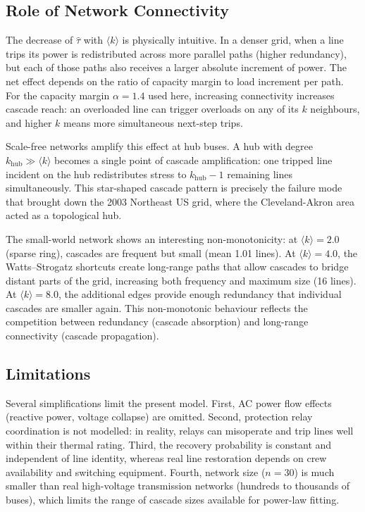 \documentclass[12pt,a4paper]{article}
\begin{document}
\subsection{Role of Network Connectivity}

The decrease of $\hat{\tau}$ with $\langle k \rangle$ is physically
intuitive. In a denser grid, when a line trips its power is
redistributed across more parallel paths (higher redundancy), but
each of those paths also receives a larger absolute increment of
power. The net effect depends on the ratio of capacity margin to
load increment per path. For the capacity margin $\alpha = 1.4$
used here, increasing connectivity increases cascade reach: an
overloaded line can trigger overloads on any of its $k$ neighbours,
and higher $k$ means more simultaneous next-step trips.

Scale-free networks amplify this effect at hub buses. A hub with
degree $k_\text{hub} \gg \langle k \rangle$ becomes a single
point of cascade amplification: one tripped line incident on the
hub redistributes stress to $k_\text{hub} - 1$ remaining lines
simultaneously. This star-shaped cascade pattern is precisely
the failure mode that brought down the 2003 Northeast US grid,
where the Cleveland-Akron area acted as a topological hub.

The small-world network shows an interesting non-monotonicity:
at $\langle k \rangle = 2.0$ (sparse ring), cascades are frequent
but small (mean 1.01 lines). At $\langle k \rangle = 4.0$,
the Watts--Strogatz shortcuts create long-range paths that allow
cascades to bridge distant parts of the grid, increasing both
frequency and maximum size (16 lines). At $\langle k \rangle = 8.0$,
the additional edges provide enough redundancy that individual
cascades are smaller again. This non-monotonic behaviour reflects
the competition between redundancy (cascade absorption) and
long-range connectivity (cascade propagation).

\subsection{Limitations}

Several simplifications limit the present model. First, AC power
flow effects (reactive power, voltage collapse) are omitted. Second,
protection relay coordination is not modelled: in reality, relays can
misoperate and trip lines well within their thermal rating. Third,
the recovery probability is constant and independent of line identity,
whereas real line restoration depends on crew availability and
switching equipment. Fourth, network size ($n=30$) is much smaller
than real high-voltage transmission networks (hundreds to thousands
of buses), which limits the range of cascade sizes available for
power-law fitting.
\end{document}
